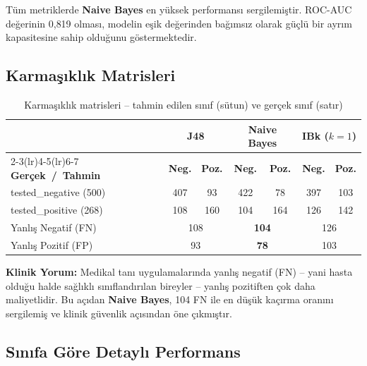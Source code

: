 \documentclass[12pt,a4paper]{article}
\begin{document}
Tüm metriklerde \textbf{Naive Bayes} en yüksek performansı sergilemiştir.
ROC-AUC değerinin 0{,}819 olması, modelin eşik değerinden bağımsız olarak
güçlü bir ayrım kapasitesine sahip olduğunu göstermektedir.

\subsection{Karmaşıklık Matrisleri}

\begin{table}[H]
\centering
\caption{Karmaşıklık matrisleri -- tahmin edilen sınıf (sütun) ve gerçek sınıf (satır)}
\label{tab:confusion}
\begin{tabular}{@{}l cc cc cc@{}}
\toprule
& \multicolumn{2}{c}{\textbf{J48}}
& \multicolumn{2}{c}{\textbf{Naive Bayes}}
& \multicolumn{2}{c}{\textbf{IBk ($k{=}1$)}} \\
\cmidrule(lr){2-3}\cmidrule(lr){4-5}\cmidrule(lr){6-7}
\textbf{Gerçek~/~Tahmin} &
\textbf{Neg.} & \textbf{Poz.} &
\textbf{Neg.} & \textbf{Poz.} &
\textbf{Neg.} & \textbf{Poz.} \\
\midrule
tested\_negative (500) & 407 &  93 & 422 &  78 & 397 & 103 \\
tested\_positive  (268) & 108 & 160 & 104 & 164 & 126 & 142 \\
\midrule
Yanlış Negatif (FN) & \multicolumn{2}{c}{108}
                    & \multicolumn{2}{c}{\textbf{104}}
                    & \multicolumn{2}{c}{126} \\
Yanlış Pozitif (FP) & \multicolumn{2}{c}{93}
                    & \multicolumn{2}{c}{\textbf{78}}
                    & \multicolumn{2}{c}{103} \\
\bottomrule
\end{tabular}
\end{table}

\textbf{Klinik Yorum:} Medikal tanı uygulamalarında yanlış negatif (FN)
-- yani hasta olduğu halde sağlıklı sınıflandırılan bireyler -- yanlış
pozitiften çok daha maliyetlidir. Bu açıdan \textbf{Naive Bayes}, 104 FN
ile en düşük kaçırma oranını sergilemiş ve klinik güvenlik açısından öne
çıkmıştır.

\subsection{Sınıfa Göre Detaylı Performans}
\end{document}
